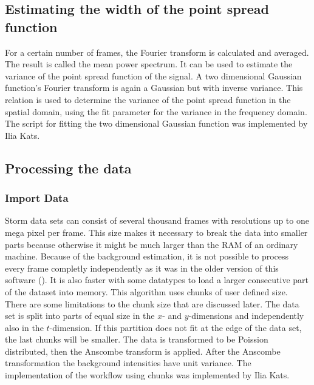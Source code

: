\subsection{Estimating the width of the point spread function}
For a certain number of frames, the Fourier transform is calculated and averaged. The result is called the mean power spectrum. It can be used to estimate the variance of the point spread function of the signal. A two dimensional Gaussian function's Fourier transform is again a Gaussian but with inverse variance. This relation is used to determine the variance of the point spread function in the spatial domain, using the fit parameter for the variance in the frequency domain.\newline
The script for fitting the two dimensional Gaussian function was implemented by Ilia Kats.
\subsection{Processing the data}
\subsubsection{Import Data}
Storm data sets can consist of several thousand frames with resolutions up to one mega pixel per frame. This size makes it necessary to break the data into smaller parts because otherwise it might be much larger than the RAM of an ordinary machine. Because of the background estimation, it is not possible to process every frame completly independently as it was in the older version of this software (\cite{MAJoachim}). It is also faster with some datatypes to load a larger consecutive part of the dataset into memory.\newline
This algorithm uses chunks of user defined size. There are some limitations to the chunk size that are discussed later. The data set is split into parts of equal size in the $x$- and $y$-dimensions and independently also in the $t$-dimension. If this partition does not fit at the edge of the data set, the last chunks will be smaller.\newline
The data is transformed to be Poission distributed, then the Anscombe transform is applied. After the Anscombe transformation the background intensities have unit variance.\newline
The implementation of the workflow using chunks was implemented by Ilia Kats.
